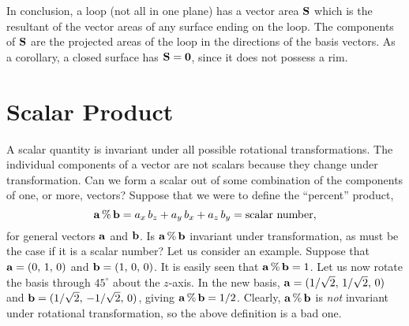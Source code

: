 In conclusion, a loop (not all in one plane) has a vector area ${\bf S}$ which
is the resultant of the vector areas of any surface ending on the loop. The
components  of ${\bf S}$ are the projected areas of the loop in the
directions of  the basis vectors. As a corollary, a closed surface has ${\bf S} = {\bf 0}$,
since it does not possess a rim. 

\section{Scalar Product}
A scalar quantity is invariant under all possible rotational transformations.
The individual components of a vector are not scalars because they change under
transformation. Can we form a scalar out of some combination of the components
of one, or more, vectors? Suppose that we were to define the
``percent''  product,
\begin{equation}
{\bf a}\,\%\,{\bf b} = a_x \,b_z + a_y \,b_x + a_z \,b_y = {\rm scalar~number},
\end{equation}
for general vectors ${\bf a}$ and ${\bf b}$. Is ${\bf a}\,\%\,{\bf b}$ 
invariant under transformation, as must be the case if it is a scalar number?
Let us consider an example. Suppose that ${\bf a} = (0,\,1,\,0)$ and
${\bf b} = (1,\,0,\,0)$. It is easily seen that ${\bf a}\,\%\,{\bf b}= 1$. Let
us now rotate the basis through $45^\circ$ about the $z$-axis. In the new
basis, ${\bf a} = (1/\sqrt{2},\, 1/\sqrt{2},\, 0)$ and ${\bf b} = (1/\sqrt{2},\,-
1/\sqrt{2},\, 0)$, giving ${\bf a}\,\%\,{\bf b} = 1/2$. Clearly, ${\bf a}\,\%\,{\bf b}$
is {\em not} invariant under rotational transformation, so 
the above definition is a bad one.

